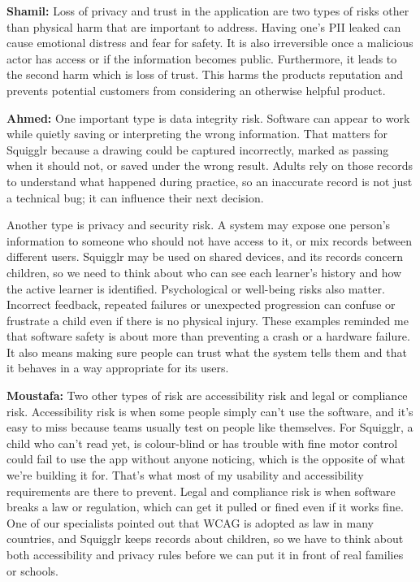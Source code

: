 \documentclass{article}
\begin{document}
\begin{enumerate}
\textbf{Shamil:} Loss of privacy and trust in the application are two types of
risks other than physical harm that are important to address. Having one's PII
leaked can cause emotional distress and fear for safety. It is also irreversible
once a malicious actor has access or if the information becomes public.
Furthermore, it leads to the second harm which is loss of trust. This harms the
products reputation and prevents potential customers from considering an
otherwise helpful product.

\textbf{Ahmed:} One important type is data integrity risk. Software can appear
to work while quietly saving or interpreting the wrong information. That matters
for Squigglr because a drawing could be captured incorrectly, marked as passing
when it should not, or saved under the wrong result. Adults rely on those
records to understand what happened during practice, so an inaccurate record is
not just a technical bug; it can influence their next decision.

Another type is privacy and security risk. A system may expose one person's
information to someone who should not have access to it, or mix records between
different users. Squigglr may be used on shared devices, and its records concern
children, so we need to think about who can see each learner's history and how
the active learner is identified. Psychological or well-being risks also matter.
Incorrect feedback, repeated failures or unexpected progression can confuse or
frustrate a child even if there is no physical injury. These examples reminded
me that software safety is about more than preventing a crash or a hardware
failure. It also means making sure people can trust what the system tells them
and that it behaves in a way appropriate for its users.


\textbf{Moustafa:} Two other types of risk are accessibility risk and legal or
compliance risk. Accessibility risk is when some people simply can't use the
software, and it's easy to miss because teams usually test on people like
themselves. For Squigglr, a child who can't read yet, is colour-blind or has
trouble with fine motor control could fail to use the app without anyone
noticing, which is the opposite of what we're building it for. That's what most
of my usability and accessibility requirements are there to prevent. Legal and
compliance risk is when software breaks a law or regulation, which can get it
pulled or fined even if it works fine. One of our specialists pointed out that
WCAG is adopted as law in many countries, and Squigglr keeps records about
children, so we have to think about both accessibility and privacy rules before
we can put it in front of real families or schools.


\end{enumerate}
\end{document}
